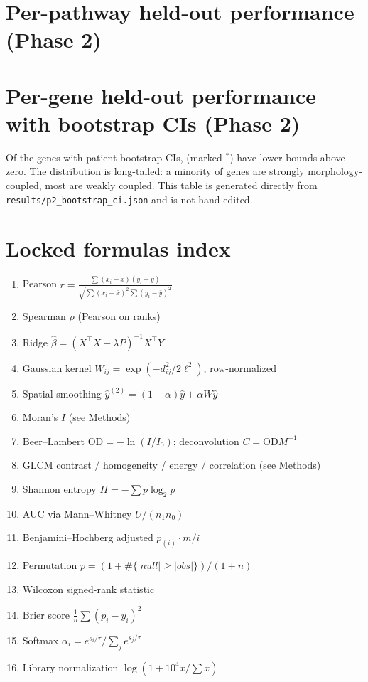 \documentclass[11pt]{article}
\begin{document}
\appendix
\appendix
\section{Per-pathway held-out performance (Phase 2)}


\section{Per-gene held-out performance with bootstrap CIs (Phase 2)}
Of the \pPerGeneN{} genes with patient-bootstrap CIs, \pPerGeneSig{} (marked $^*$)
have lower bounds above zero. The distribution is long-tailed: a minority of genes
are strongly morphology-coupled, most are weakly coupled. This table is generated
directly from \texttt{results/p2\_bootstrap\_ci.json} and is not hand-edited.


\section{Locked formulas index}
\begin{enumerate}[leftmargin=1.6em]
\item Pearson $r = \frac{\sum (x_i-\bar{x})(y_i-\bar{y})}{\sqrt{\sum (x_i-\bar{x})^2 \sum (y_i-\bar{y})^2}}$
\item Spearman $\rho$ (Pearson on ranks)
\item Ridge $\hat\beta = (X^\top X + \lambda P)^{-1} X^\top Y$
\item Gaussian kernel $W_{ij} = \exp(-d_{ij}^2 / 2\ell^2)$, row-normalized
\item Spatial smoothing $\hat y^{(2)} = (1-\alpha)\hat y + \alpha W \hat y$
\item Moran's $I$ (see Methods)
\item Beer--Lambert $\mathrm{OD} = -\ln(I/I_0)$; deconvolution $C = \mathrm{OD} M^{-1}$
\item GLCM contrast / homogeneity / energy / correlation (see Methods)
\item Shannon entropy $H = -\sum p \log_2 p$
\item AUC via Mann--Whitney $U/(n_1 n_0)$
\item Benjamini--Hochberg adjusted $p_{(i)} \cdot m / i$
\item Permutation $p = (1 + \#\{|null| \ge |obs|\})/(1+n)$
\item Wilcoxon signed-rank statistic
\item Brier score $\frac{1}{n}\sum (p_i-y_i)^2$
\item Softmax $\alpha_i = e^{s_i/\tau} / \sum_j e^{s_j/\tau}$
\item Library normalization $\log(1 + 10^4 x / \sum x)$
\end{enumerate}
\end{document}
